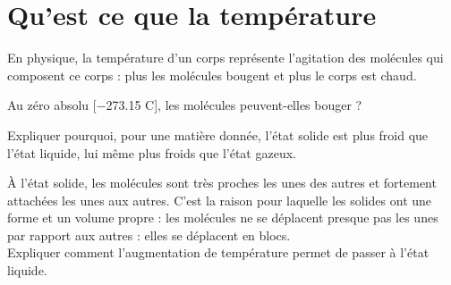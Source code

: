 \section{Qu'est ce que la température }\label{ex:temperture}

En physique, la température d'un corps représente l'agitation des molécules qui composent ce corps : plus les molécules bougent et plus le corps est chaud.

\begin{questions}
	\question[] Au zéro absolu [\num{-273.15} \degree C], les molécules peuvent-elles bouger ?
	
	\question[] Expliquer pourquoi, pour une matière donnée, l'état solide est plus froid que l'état liquide, lui même plus froids que l'état gazeux.
	
	\question[] À l'état solide, les molécules sont très proches les unes des autres et fortement attachées les unes aux autres. C'est la raison pour laquelle les solides ont une forme et un volume propre : les molécules ne se déplacent presque pas les unes par rapport aux autres : elles se déplacent en blocs. \\ Expliquer comment l'augmentation de température permet de passer à l'état liquide.
\end{questions}